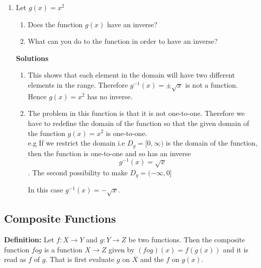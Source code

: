 \documentclass[11pt,a4paper]{article}
\begin{document}
\begin{enumerate}
\begin{enumerate}
\item $x=1$ makes $f^{-1}(x)$ undefined.\\
\end{enumerate}

\item Let $g(x)=x^2$
\begin{enumerate}
     \item Does the function $g(x)$ have an inverse?
     \item What can you do to the function in order to have an inverse?\\
\end{enumerate}

\textbf{Solutions}
\begin{enumerate}
       \item This shows that each element in the domain will have two different elements in the range. Therefore $g^{-1}(x)=\pm \sqrt{x}$ is not a function. Hence $g(x)=x^2$ has no inverse.
       \item The problem in this function is that it is not one-to-one. Therefore we have to redefine the domain of the function so that the given domain of the function $g(x)=x^2$ is one-to-one.\\
e.g If we restrict the domain i.e $D_g=[0,\infty)$ is the domain of the function, then the function is one-to-one and so has an inverse $$g^{-1}(x)=\sqrt{x}$$.
The second possibility to make $D_g=(-\infty,0]$

\begin{figure}[H]
\centering
{}
\end{figure}

In this case $g^{-1}(x)=-\sqrt{x}$.\\
\end{enumerate}
\end{enumerate}



\subsection{Composite Functions}
\textbf{Definition:} Let $f:X\longrightarrow Y$ and $g:Y\longrightarrow Z$ be two functions. Then the composite function $fog$ is a function $X\longrightarrow Z$ given by $(fog)(x)=f(g(x))$ and it is read as $f$ of $g$. That is first evaluate $g$ on $X$ and the $f$ on $g(x)$.\\
\end{document}
